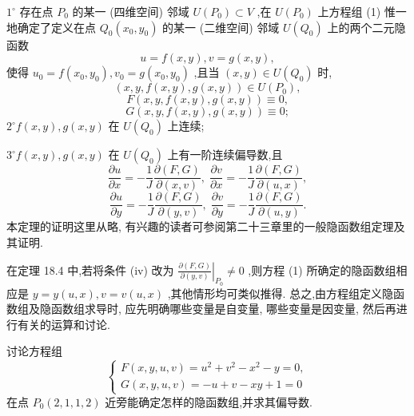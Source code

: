 \({1}^{ \circ  }\) 存在点 \({P}_{0}\) 的某一 (四维空间) 邻域 \(U\left( {P}_{0}\right)  \subset  V\) ,在 \(U\left( {P}_{0}\right)\) 上方程组 (1) 惟一地确定了定义在点 \({Q}_{0}\left( {{x}_{0},{y}_{0}}\right)\) 的某一 (二维空间) 邻域 \(U\left( {Q}_{0}\right)\) 上的两个二元隐函数
\[
u = f\left( {x,y}\right) ,v = g\left( {x,y}\right) ,
\]
使得 \({u}_{0} = f\left( {{x}_{0},{y}_{0}}\right) ,{v}_{0} = g\left( {{x}_{0},{y}_{0}}\right)\) ,且当 \(\left( {x,y}\right)  \in  U\left( {Q}_{0}\right)\) 时,
\[
\left( {x,y,f\left( {x,y}\right) ,g\left( {x,y}\right) }\right)  \in  U\left( {P}_{0}\right) ,
\]
\[
F\left( {x,y,f\left( {x,y}\right) ,g\left( {x,y}\right) }\right)  \equiv  0,
\]
\[
G\left( {x,y,f\left( {x,y}\right) ,g\left( {x,y}\right) }\right)  \equiv  0;
\]
\({2}^{ \circ  }f\left( {x,y}\right) ,g\left( {x,y}\right)\) 在 \(U\left( {Q}_{0}\right)\) 上连续;

\({3}^{ \circ  }f\left( {x,y}\right) ,g\left( {x,y}\right)\) 在 \(U\left( {Q}_{0}\right)\) 上有一阶连续偏导数,且
\[
\frac{\partial u}{\partial x} =  - \frac{1}{J}\frac{\partial \left( {F,G}\right) }{\partial \left( {x,v}\right) },\;\frac{\partial v}{\partial x} =  - \frac{1}{J}\frac{\partial \left( {F,G}\right) }{\partial \left( {u,x}\right) }, \tag{5}
\]
\[
\frac{\partial u}{\partial y} =  - \frac{1}{J}\frac{\partial \left( {F,G}\right) }{\partial \left( {y,v}\right) },\;\frac{\partial v}{\partial y} =  - \frac{1}{J}\frac{\partial \left( {F,G}\right) }{\partial \left( {u,y}\right) }.
\]
本定理的证明这里从略, 有兴趣的读者可参阅第二十三章里的一般隐函数组定理及其证明.

\begin{remark}

\end{remark}
在定理 18.4 中,若将条件 (iv) 改为 \({\left. \frac{\partial \left( {F,G}\right) }{\partial \left( {y,v}\right) }\right| }_{{P}_{0}} \neq  0\) ,则方程 (1) 所确定的隐函数组相应是 \(y = y\left( {u,x}\right) ,v = v\left( {u,x}\right)\) ,其他情形均可类似推得. 总之,由方程组定义隐函数组及隐函数组求导时, 应先明确哪些变量是自变量, 哪些变量是因变量, 然后再进行有关的运算和讨论.

\begin{example}

\end{example}
讨论方程组
\[
\left\{  \begin{array}{l} F\left( {x,y,u,v}\right)  = {u}^{2} + {v}^{2} - {x}^{2} - y = 0, \\  G\left( {x,y,u,v}\right)  =  - u + v - {xy} + 1 = 0 \end{array}\right.  \tag{6}
\]
在点 \({P}_{0}\left( {2,1,1,2}\right)\) 近旁能确定怎样的隐函数组,并求其偏导数.

